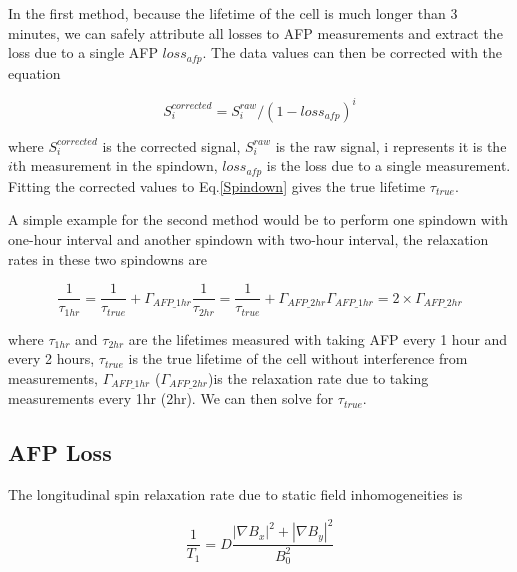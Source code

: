 In the first method, because the lifetime of the cell is much longer than 3 minutes, we can safely attribute all losses to AFP measurements and extract the loss due to a single AFP $loss_{afp}$. The data values can then be corrected with the equation

\begin{equation}
S_{i}^{corrected}=S_{i}^{raw}/(1-loss_{afp})^{i}
\end{equation}

where $S_{i}^{corrected}$ is the corrected signal, $S_{i}^{raw}$ is the raw signal, i represents it is the $i$th measurement in the spindown, $loss_{afp}$ is the loss due to a single measurement. Fitting the corrected values to Eq.\ref{Spindown} gives the true lifetime $\tau_{true}$.

A simple example for the second method would be to perform one spindown with one-hour interval and another spindown with two-hour interval, the relaxation rates in these two spindowns are

\begin{subequations}
	\begin{equation}
	\frac{1}{\tau_{1hr}}=\frac{1}{\tau_{true}}+\Gamma_{AFP\_1hr}
	\end{equation}
	\begin{equation}
	\frac{1}{\tau_{2hr}}=\frac{1}{\tau_{true}}+\Gamma_{AFP\_2hr}
	\end{equation}
	\begin{equation}
	\Gamma_{AFP\_1hr}=2\times \Gamma_{AFP\_2hr}
	\end{equation}
\end{subequations}

where $\tau_{1hr}$ and $\tau_{2hr}$ are the lifetimes measured with taking AFP every 1 hour and every 2 hours, $\tau_{true}$ is the true lifetime of the cell without interference from measurements, $\Gamma_{AFP\_1hr}$ ($\Gamma_{AFP\_2hr}$)is the relaxation rate due to taking measurements every 1hr (2hr). We can then solve for $\tau_{true}$.

\subsection{AFP Loss}

The longitudinal spin relaxation rate due to static field inhomogeneities is

\begin{equation}
\frac{1}{T_{1}} = D\frac{|\nabla B_{x}|^{2}+|\nabla B_{y}|^{2}}{B_{0}^{2}}
\end{equation}

